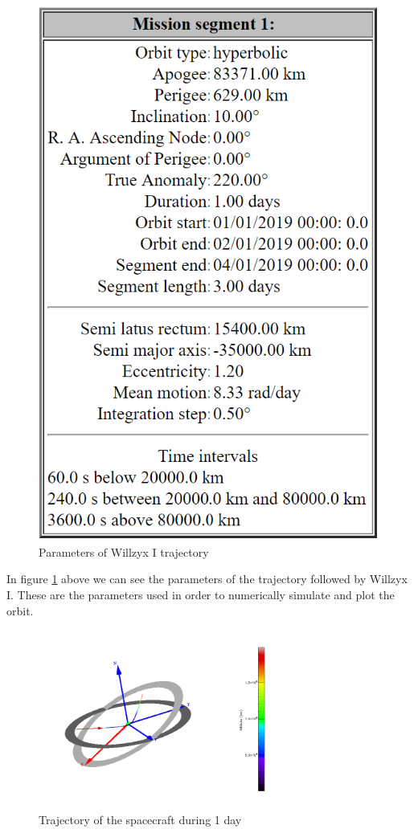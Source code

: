 \begin{figure}[h!]
\centering
\includegraphics[scale=1]{figures/OrbitParameters.png}
\caption{Parameters of Willzyx I trajectory}
\label{OrbitParam}
\end{figure} 

In figure \ref{OrbitParam} above we can see the parameters of the trajectory followed by Willzyx I. These are the parameters used in order to numerically simulate and plot the orbit. 

\begin{figure}[h!]
\centering
\includegraphics[width=0.7\textwidth]{figures/Trajectory.png}
\caption{Trajectory of the spacecraft during 1 day}
\label{Trajectory}
\end{figure}  

